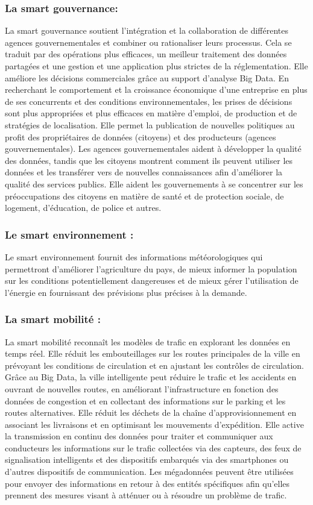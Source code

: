 \documentclass[french, a4paper, 12pt]{report}
\begin{document}
\subsubsection{La smart gouvernance:}
La smart gouvernance soutient l'intégration et la collaboration de différentes agences gouvernementales et combiner ou rationaliser leurs processus. Cela se traduit par des opérations plus efficaces, un meilleur traitement des données partagées et une gestion et une application plus strictes de la réglementation.
Elle améliore les décisions commerciales grâce au support d'analyse Big Data. En recherchant le comportement et la croissance économique d’une entreprise en plus de ses concurrents et des conditions environnementales, les prises de décisions sont plus appropriées et plus efficaces en matière d’emploi, de production et de stratégies de localisation.
Elle permet la publication de nouvelles politiques au profit des propriétaires de données (citoyens) et des producteurs (agences gouvernementales). Les agences gouvernementales aident à développer la qualité des données, tandis que les citoyens montrent comment ils peuvent utiliser les données et les transférer vers de nouvelles connaissances afin d'améliorer la qualité des services publics.
Elle aident les gouvernements à se concentrer sur les préoccupations des citoyens en matière de santé et de protection sociale, de logement, d’éducation, de police et autres.\\
\subsubsection{Le smart environnement :}
Le smart environnement fournit des informations météorologiques qui permettront d’améliorer l’agriculture du pays, de mieux informer la population sur les conditions potentiellement dangereuses et de mieux gérer l’utilisation de l’énergie en fournissant des prévisions plus précises à la demande.\\
\subsubsection{La smart mobilité :}
La smart mobilité reconnaît les modèles de trafic en explorant les données en temps réel. 
Elle réduit les embouteillages sur les routes principales de la ville en prévoyant les conditions de circulation et en ajustant les contrôles de circulation. Grâce au Big Data, la ville intelligente peut réduire le trafic et les accidents en ouvrant de nouvelles routes, en améliorant l'infrastructure en fonction des données de congestion et en collectant des informations sur le parking et les routes alternatives.
Elle réduit les déchets de la chaîne d'approvisionnement en associant les livraisons et en optimisant les mouvements d'expédition.
Elle active la transmission en continu des données pour traiter et communiquer aux conducteurs les informations sur le trafic collectées via des capteurs, des feux de signalisation intelligents et des dispositifs embarqués via des smartphones ou d'autres dispositifs de communication.
Les mégadonnées peuvent être utilisées pour envoyer des informations en retour à des entités spécifiques afin qu’elles prennent des mesures visant à atténuer ou à résoudre un problème de trafic.\\
\end{document}
